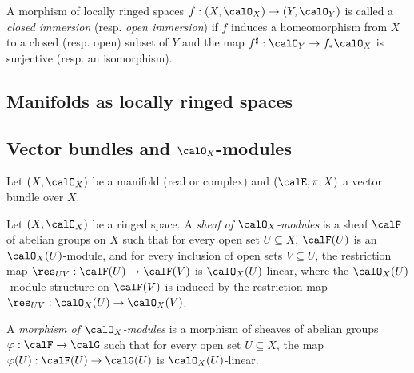     \begin{definition}\label{def:closed_and_open_immersion_of_locally_ringed_space}
        A morphism of locally ringed spaces \(f : (X, \calO_X) \to (Y, \calO_Y)\) is called a \emph{closed immersion} (resp. \emph{open immersion}) if 
        \(f\) induces a homeomorphism from \(X\) to a closed (resp. open) subset of \(Y\) and the map \(f^\sharp : \calO_Y \to f_*\calO_X\) is surjective (resp. an isomorphism).
    \end{definition}



\subsection{Manifolds as locally ringed spaces}


    

\subsection[Vector bundles and O\_X-modules]{Vector bundles and \(\calO_X\)-modules}

    Let \((X,\calO_X)\) be a manifold (real or complex) and \((\calE, \pi, X)\) a vector bundle over \(X\).


    \begin{definition}\label{def:sheaf_of_modules}
        Let \((X,\calO_X)\) be a ringed space.
        A \emph{sheaf of \(\calO_X\)-modules} is a sheaf \(\calF\) of abelian groups on \(X\) such that for every open set \(U\subseteq X\), 
        \(\calF(U)\) is an \(\calO_X(U)\)-module, 
        and for every inclusion of open sets \(V\subseteq U\), the restriction map \(\res_{UV}:\calF(U)\to \calF(V)\) is \(\calO_X(U)\)-linear, 
        where the \(\calO_X(U)\)-module structure on \(\calF(V)\) is induced by the restriction map \(\res_{UV}:\calO_X(U)\to \calO_X(V)\).
        
        A \emph{morphism of \(\calO_X\)-modules} is a morphism of sheaves of abelian groups \(\varphi:\calF\to \calG\) such that 
        for every open set \(U\subseteq X\), the map \(\varphi(U):\calF(U)\to \calG(U)\) is \(\calO_X(U)\)-linear.
    \end{definition}


